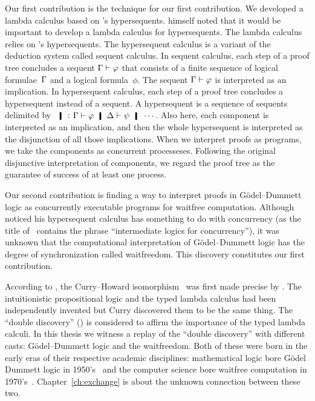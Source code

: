 Our first contribution is the technique for our first contribution.
We developed a lambda calculus based on \citet{avron91}'s hypersequents.
\citet{avron91} himself noted that it would be important to develop a
lambda calculus for hypersequents.
The lambda calculus relies on \citet{avron91}'s hypersequents.
The hypersequent calculus is a
variant of the deduction system called sequent calculus.  In sequent
calculus, each step of a proof tree concludes a sequent $\Gamma\vdash\varphi$ that
consists of a finite sequence of logical formulae~$\Gamma$ and a logical
formula~$\phi$.  The sequent $\Gamma\vdash\varphi$ is
interpreted as an implication.  In hypersequent calculus, each step of a
proof tree concludes a hypersequent instead of a sequent.  A
hypersequent is a sequence of sequents delimited by $\hmid$:
$\G\vdash\phi\hmid \D\vdash\psi
\hmid \cdots$.  Also here, each component is interpreted as an
implication, and then the whole hypersequent is interpreted as the
disjunction of all those implications.
When we interpret proofs as programs, we take the components as
concurrent processeses.  Following the original disjunctive
interpretation of components, we regard the proof tree as the guarantee of
success of at least one process.

Our second contribution is finding a way to interpret proofs in
G\"odel--Dummett logic as
concurrently executable programs for waitfree computation.
Although \citet{avron91} noticed his hypersequent calculus has something
to do with concurrency (as the title of~\citep{avron91} contains the phrase
``intermediate logics for concurrency''), it was unknown that
the computational interpretation of G\"odel--Dummett logic has
the degree of synchronization called waitfreedom.  This discovery
constitutes our first contribution.

According to \citet[p.97]{curryhoward},
the Curry--Howard isomorphism~\citep{curryhoward} was first made
precise by \citet[\textbf{9}E and
\textbf{9}F]{curry1974combinatory}.
The intuitionistic propositional logic and the typed lambda calculus
had been independently invented but Curry discovered them to be the same thing.
The ``double discovery'' (\citet{wadler2012propositions}) is considered
to affirm the importance of the typed lambda calculi.
In this thesis we witness a replay of the ``double discovery'' with
different casts: G\"odel--Dummett logic and the waitfreedom.
Both of these were born in the early eras of their respective academic
disciplines:
mathematical logic bore G\"odel Dummett logic in
1950's~\citep{dummett59}
and the computer science bore waitfree computation in
1970's~\citep{lamport1979make}.
Chapter~\ref{ch:exchange} is about the unknown connection between these two.

